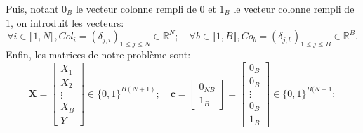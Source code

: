 Puis, notant $0_B$ le vecteur colonne rempli de $0$ et $1_B$ le vecteur colonne rempli de $1$, on introduit les vecteurs:
\[
\forall i \in \llbracket 1, N \rrbracket, 
Col_i = (\delta_{j, i})_{1 \le j \le N} \in \mathbb{R}^{N}; \quad
\forall b \in \llbracket 1, B \rrbracket, 
Co_b = (\delta_{j, b})_{1 \le j \le B} \in \mathbb{R}^{B}.
\]
Enfin, les matrices de notre problème sont:
\[
\mathbf{X} = 
\begin{bmatrix}
    X_1 \\
    X_2 \\
    \vdots \\
    X_B \\
    Y
\end{bmatrix} \in \{0, 1\}^{B(N+1)}; \quad
\mathbf{c} = \begin{bmatrix}
    0_{NB} \\
    1_B
\end{bmatrix} = 
\begin{bmatrix}
    0_B \\
    0_B \\
    \vdots \\
    0_B \\
    1_B
\end{bmatrix} \in \{0, 1\}^{B(N+1};
\]

